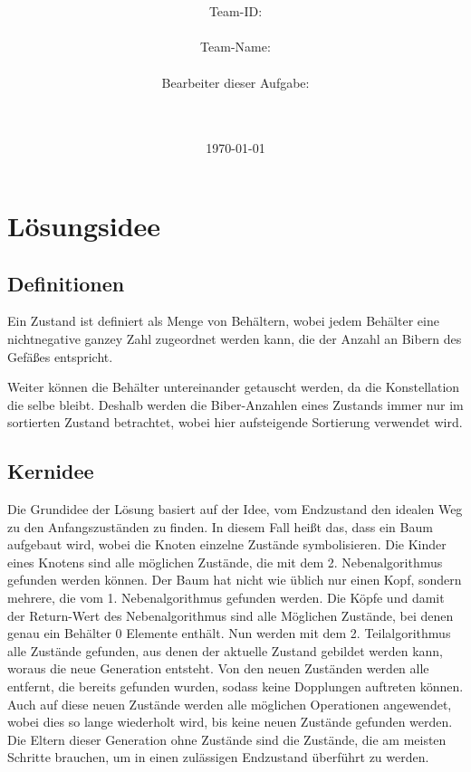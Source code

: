 \documentclass[a4paper,10pt,ngerman]{scrartcl}
\title{\textbf{\Huge\Aufgabe}}
\author{\LARGE Team-ID: \LARGE \TeamID \\\\
	    \LARGE Team-Name: \LARGE \TeamName \\\\
	    \LARGE Bearbeiter dieser Aufgabe: \\ 
	    \LARGE \Namen\\\\}
\date{\LARGE\today}
\begin{document}
\maketitle
\tableofcontents

\vspace{0.5cm}

\section{Lösungsidee}

\subsection{Definitionen}

Ein Zustand ist definiert als Menge von Behältern, wobei jedem Behälter eine nichtnegative ganzey Zahl zugeordnet werden kann, die der Anzahl an Bibern des Gefäßes entspricht.

Weiter können die Behälter untereinander getauscht werden, da die Konstellation die selbe bleibt. Deshalb werden die Biber-Anzahlen eines Zustands immer nur im sortierten Zustand betrachtet, wobei hier aufsteigende Sortierung verwendet wird.

\subsection{Kernidee}
Die Grundidee der Lösung basiert auf der Idee, vom Endzustand den idealen Weg zu den Anfangszuständen zu finden. In diesem Fall heißt das, dass ein Baum  aufgebaut wird, wobei die Knoten einzelne Zustände symbolisieren. Die Kinder eines Knotens sind alle möglichen Zustände, die mit dem 2. Nebenalgorithmus gefunden werden können. Der Baum hat nicht wie üblich nur einen Kopf, sondern mehrere, die vom 1. Nebenalgorithmus gefunden werden. Die Köpfe und damit der Return-Wert des Nebenalgorithmus sind alle Möglichen Zustände, bei denen genau ein Behälter 0 Elemente enthält. Nun werden mit dem 2. Teilalgorithmus alle Zustände gefunden, aus denen der aktuelle Zustand gebildet werden kann, woraus die neue Generation entsteht. Von den neuen Zuständen werden alle entfernt, die bereits gefunden wurden, sodass keine Dopplungen auftreten können. Auch auf diese neuen Zustände werden alle möglichen Operationen angewendet, wobei dies so lange wiederholt wird, bis keine neuen Zustände gefunden werden. Die Eltern dieser Generation ohne Zustände sind die Zustände, die am meisten Schritte brauchen, um in einen zulässigen Endzustand überführt zu werden.
\end{document}
